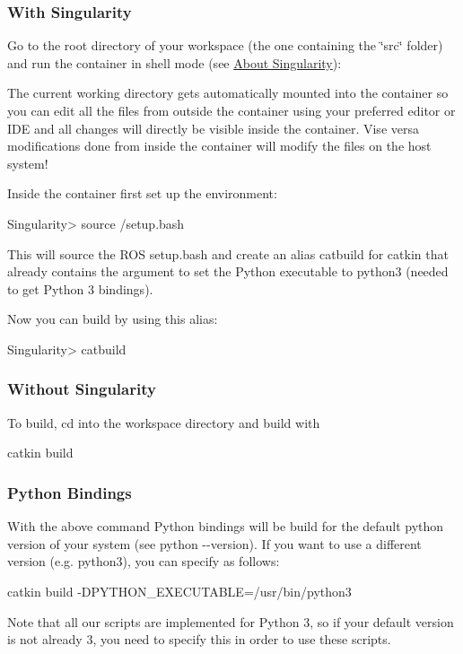 \subsubsection*{With Singularity}

Go to the root directory of your workspace (the one containing the \char`\"{}src\char`\"{} folder) and run the container in shell mode (see \hyperlink{md_doc_singularity}{About Singularity})\+: 


The current working directory gets automatically mounted into the container so you can edit all the files from outside the container using your preferred editor or I\+DE and all changes will directly be visible inside the container. Vise versa modifications done from inside the container will modify the files on the host system!

Inside the container first set up the environment\+: \begin{DoxyVerb}Singularity> source /setup.bash
\end{DoxyVerb}


This will source the R\+OS {\ttfamily setup.\+bash} and create an alias {\ttfamily catbuild} for catkin that already contains the argument to set the Python executable to python3 (needed to get Python 3 bindings).

Now you can build by using this alias\+: \begin{DoxyVerb}Singularity> catbuild
\end{DoxyVerb}


\subsubsection*{Without Singularity}

To build, cd into the {\ttfamily workspace} directory and build with \begin{DoxyVerb}catkin build
\end{DoxyVerb}


\subsubsection*{Python Bindings}

With the above command Python bindings will be build for the default python version of your system (see {\ttfamily python -\/-\/version}). If you want to use a different version (e.\+g. python3), you can specify as follows\+: \begin{DoxyVerb}catkin build -DPYTHON_EXECUTABLE=/usr/bin/python3
\end{DoxyVerb}


Note that all our scripts are implemented for Python 3, so if your default version is not already 3, you need to specify this in order to use these scripts. 